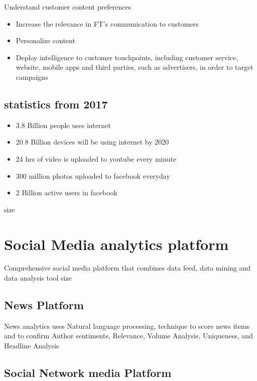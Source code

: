 \documentclass[sigconf]{acmart}
\begin{document}
Understand customer content preferences
\begin{itemize}
\item Increase the relevance in FT’s communication to customers
\item Personalize content
\item Deploy intelligence to customer touchpoints, including customer service, website, mobile apps and third parties, such as advertisers, in order to target campaigns
\end{itemize}

\subsection{statistics from 2017}

\begin{itemize} 
\item  3.8 Billion people uses internet
\item  20.8 Billion devices will be using internet by 2020
\item 24 hrs of video is uploaded to youtube every minute
\item 300 million photos uploaded to facebook everyday
\item 2 Billion active users in facebook
\end{itemize}
size \cite{Stats}

\section{Social Media analytics platform}

Comprehensive social media platform that combines data feed, data mining and data analysis tool
size \cite{SocialMedia}

\subsection{News Platform}

News analytics uses Natural language processing, technique to score news items and to confirm Author sentiments, Relevance, Volume Analysis, Uniqueness, and Headline Analysis

\subsection{Social Network media Platform}
\end{document}
